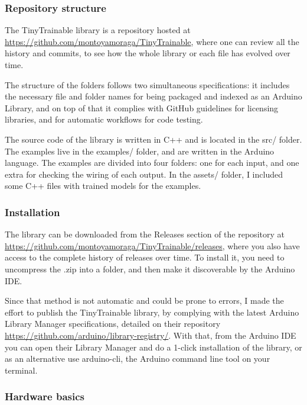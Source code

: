 \subsubsection{Repository structure}

The TinyTrainable library is a repository hosted at \url{https://github.com/montoyamoraga/TinyTrainable}, where one can review all the history and \glspl{commit}, to see how the whole library or each file has evolved over time.

The structure of the folders follows two simultaneous specifications: it includes the necessary file and folder names for being packaged and indexed as an Arduino Library, and on top of that it complies with GitHub guidelines for licensing libraries, and for automatic workflows for code testing.

The source code of the library is written in C++ and is located in the src/ folder. The examples live in the examples/ folder, and are written in the Arduino language. The examples are divided into four folders: one for each input, and one extra for checking the wiring of each output. In the assets/ folder, I included some C++ files with trained models for the examples.

\subsubsection{Installation}

The library can be downloaded from the Releases section of the repository at  \url{https://github.com/montoyamoraga/TinyTrainable/releases}, where you also have access to the complete history of releases over time. To install it, you need to uncompress the .zip into a folder, and then make it discoverable by the Arduino IDE.

Since that method is not automatic and could be prone to errors, I made the effort to publish the TinyTrainable library, by complying with the latest Arduino Library Manager specifications, detailed on their repository \url{https://github.com/arduino/library-registry/}. With that, from the Arduino IDE you can open their Library Manager and do a 1-click installation of the library, or as an alternative use arduino-cli, the Arduino command line tool on your terminal.

\subsubsection{Hardware basics}

